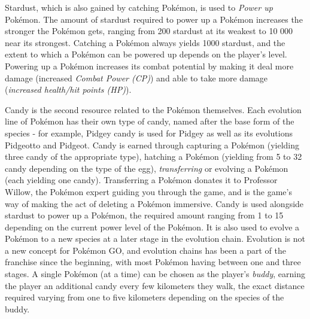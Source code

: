 Stardust, which is also gained by catching Pokémon, is used to \emph{Power up} Pokémon. The amount of stardust required to power up a Pokémon increases the stronger the Pokémon gets, ranging from 200 stardust at its weakest to 10 000 near its strongest. Catching a Pokémon always yields 1000 stardust, and the extent to which a Pokémon can be powered up depends on the player's level. Powering up a Pokémon increases its combat potential by making it deal more damage (increased \emph{Combat Power (CP)}) and able to take more damage (\emph{increased health/hit points (HP)}).

Candy is the second resource related to the Pokémon themselves. Each evolution line of Pokémon has their own type of candy, named after the base form of the species - for example, Pidgey candy is used for Pidgey as well as its evolutions Pidgeotto and Pidgeot. Candy is earned through capturing a Pokémon (yielding three candy of the appropriate type), hatching a Pokémon (yielding from 5 to 32 candy depending on the type of the egg), \emph{transferring} or evolving a Pokémon (each yielding one candy). Transferring a Pokémon donates it to Professor Willow, the Pokémon expert guiding you through the game, and is the game's way of making the act of deleting a Pokémon immersive. Candy is used alongside stardust to power up a Pokémon, the required amount ranging from 1 to 15 depending on the current power level of the Pokémon. It is also used to evolve a Pokémon to a new species at a later stage in the evolution chain. Evolution is not a new concept for Pokémon GO, and evolution chains has been a part of the franchise since the beginning, with most Pokémon having between one and three stages. A single Pokémon (at a time) can be chosen as the player's \emph{buddy}, earning the player an additional candy every few kilometers they walk, the exact distance required varying from one to five kilometers depending on the species of the buddy.

